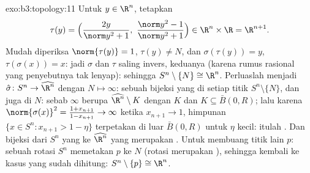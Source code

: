 \begin{solution}{exo:b3:topology:11}
Untuk $y \in \R^n$, tetapkan
\[
\tau(y) = \Bigl(\frac{2y}{\norm y^2 + 1},\ \frac{\norm y^2 -
1}{\norm y^2 + 1}\Bigr) \in \R^n\times\R = \R^{n+1}.
\]
Mudah diperiksa $\norm{\tau(y)} = 1$, $\tau(y) \neq N$, dan
$\sigma(\tau(y)) = y$, $\tau(\sigma(x)) = x$: jadi $\sigma$ dan
$\tau$ saling invers, keduanya  (karena rumus rasional
yang penyebutnya tak lenyap): sehingga $S^n\setminus\{N\} \cong
\R^n$. Perluaslah menjadi $\hat\sigma \colon S^n \to \widehat{\R^n}$ dengan
$N \mapsto \infty$: sebuah bijeksi yang  di setiap titik
$S^n\setminus\{N\}$, dan juga di $N$: sebab  
$\infty$ berupa $\widehat{\R^n}\setminus K$ dengan $K$  dan $K
\subseteq \bar B(0, R)$; lalu karena $\norm{\sigma(x)}^2 = \frac{1 +
x_{n+1}}{1 - x_{n+1}} \to \infty$ ketika $x_{n+1} \to 1$, himpunan
$\{x \in S^n : x_{n+1} > 1 - \eta\}$ terpetakan di luar $\bar B(0,R)$
untuk $\eta$ kecil: itulah . Dan bijeksi  dari
$S^n$ yang  ke $\widehat{\R^n}$ yang  merupakan
. Untuk membuang titik lain $p$: sebuah rotasi $S^n$
memetakan $p$ ke $N$ (rotasi merupakan ), sehingga kembali ke
kasus yang sudah dihitung: $S^n \setminus \{p\} \cong \R^n$.
\end{solution}

